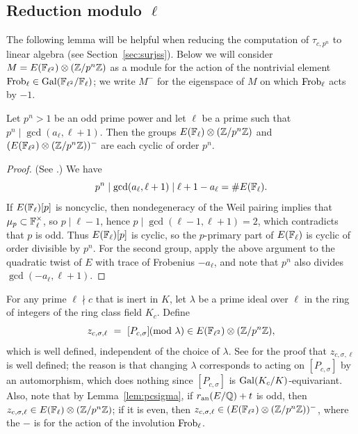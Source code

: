 \documentclass{article} \usepackage[active]{srcltx}
\begin{document}


\subsection{Reduction modulo $\ell$}\label{sec:redmodell}
 
The following lemma will be helpful when reducing the 
computation of $\tau_{c,p^n}$ to linear algebra (see
Section~\ref{sec:surjss}).
Below we will consider $M=E(\mathbb{F}_{\ell^2})\otimes (\mathbb{Z}/p^n\mathbb{Z})$ as a 
module for the action of the nontrivial element $\operatorname{Frob}_{\ell} \in \operatorname{Gal}(\mathbb{F}_{\ell^2}/\mathbb{F}_{\ell})$;
we write $M^-$ for the eigenspace of $M$ on which $\operatorname{Frob}_{\ell}$ acts by $-1$.
\begin{lemma}\label{lem:cyclic} Let $p^n>1$ be an odd
prime power and let $\ell$ be a prime such that $p^n \mid\gcd(a_{\ell},
\ell+1)$.  Then the groups $E(\mathbb{F}_{\ell})\otimes (\mathbb{Z}/p^n\mathbb{Z})$
and $(E(\mathbb{F}_{\ell^2})\otimes (\mathbb{Z}/p^n\mathbb{Z}))^{-}$
are each cyclic of order $p^n$. 
\end{lemma}
\begin{proof} (See \cite[Lem.~5.1]{stein:ggz}.) We have
 $$p^n \mid\gcd(a_{\ell},\ell+1)\mid \ell+1 - a_{\ell} = \#E(\mathbb{F}_{\ell}).$$  
If $E(\mathbb{F}_{\ell})[p]$ is noncyclic, then nondegeneracy of the Weil pairing implies that
$\mu_p \subset \mathbb{F}_{\ell}^{\times}$, so $p\mid \ell-1$, hence
$p\mid\gcd(\ell-1,\ell+1)=2$, which contradicts that $p$ is odd.  Thus
$E(\mathbb{F}_{\ell})[p]$ is cyclic, so 
the $p$-primary part of $E(\mathbb{F}_{\ell})$ is cyclic of order divisible by
$p^n$.
For the second group, apply the above argument to the quadratic twist of $E$
with trace of Frobenius $-a_{\ell}$, and note 
that $p^n$ also divides $\gcd(-a_{\ell}, \ell+1)$.
\end{proof}

For any prime $\ell\nmid c$ that is inert in $K$, let $\lambda$ be a
prime ideal over $\ell$ in the ring of integers of the ring class
field $K_c$.  Define
\begin{equation}\label{eqn:zcsigmaell}
  z_{c,\sigma,\ell}\,\, =\,\, [P_{c,\sigma}]\!\!\!\pmod{\lambda} \in
E(\mathbb{F}_{\ell^2})\otimes (\mathbb{Z}/p^n\mathbb{Z}),
\end{equation}
which is well defined, independent of the choice of $\lambda$.  See
\cite[Prop.~5.4]{stein:ggz} for the proof that $z_{c,\sigma,\ell}$ is
well defined; the reason is that changing $\lambda$ corresponds to
acting on $[P_{c,\sigma}]$ by an automorphism, which does nothing
since $[P_{c,\sigma}]$ is $\operatorname{Gal}(K_c/K)$-equivariant.  Also, note that by
Lemma~\ref{lem:pcsigma}, if $r_{{\rm an}}(E/\mathbb{Q})+t$ is odd, then
$z_{c,\sigma,\ell} \in E(\mathbb{F}_{\ell})\otimes (\mathbb{Z}/p^n\mathbb{Z})$; if it is even,
then $z_{c,\sigma,\ell} \in (E(\mathbb{F}_{\ell^2})\otimes (\mathbb{Z}/p^n\mathbb{Z}))^{-}$,
where the $-$ is for the action of the involution $\operatorname{Frob}_{\ell}$.
\end{document}
